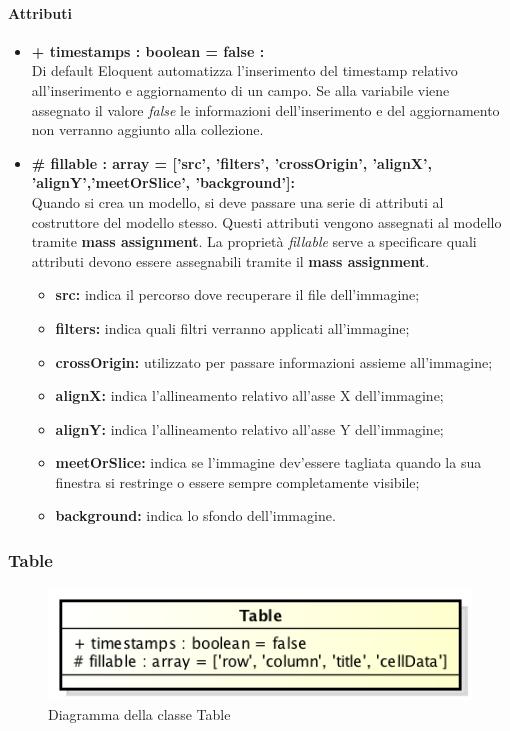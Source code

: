 	\paragraph{Attributi}
	\begin{itemize}
		\item \textbf{+ timestamps : boolean = false :}\\
		Di default Eloquent automatizza l'inserimento del timestamp relativo all'inserimento e aggiornamento di un campo. Se alla variabile viene assegnato il valore \textit{false} le informazioni dell'inserimento e del aggiornamento non verranno aggiunto alla collezione.
		\item \textbf{\# fillable : array = [’src’, ’filters’, ’crossOrigin’, ’alignX’, ’alignY’,’meetOrSlice’, ’background’]:}\\
		Quando si crea un modello, si deve passare una serie di attributi al costruttore del modello stesso. Questi attributi vengono assegnati al modello tramite \textbf{mass assignment}. La proprietà \textit{fillable} serve a specificare quali attributi devono essere assegnabili tramite il \textbf{mass assignment}.
		\begin{itemize}
			\item \textbf{src:} indica il percorso dove recuperare il file dell'immagine;
			\item \textbf{filters:} indica quali filtri verranno applicati all'immagine;
			\item \textbf{crossOrigin:} utilizzato per passare informazioni assieme all'immagine;
			\item \textbf{alignX:} indica l'allineamento relativo all'asse X dell'immagine;
			\item \textbf{alignY:} indica l'allineamento relativo all'asse Y dell'immagine;
			\item \textbf{meetOrSlice:} indica se l'immagine dev'essere tagliata quando la sua finestra si restringe o essere sempre completamente visibile;
			\item \textbf{background:} indica lo sfondo dell'immagine.
		\end{itemize}
	\end{itemize}
\newpage


\subsubsection{Table}

	\begin{figure}[h]
		\centering
		\includegraphics[width=0.5\linewidth]{img/back_end_premi_model_table}
		\caption[Diagramma della classe Table]{Diagramma della classe Table}
		\label{fig:back_end_premi_model_table}
	\end{figure}


